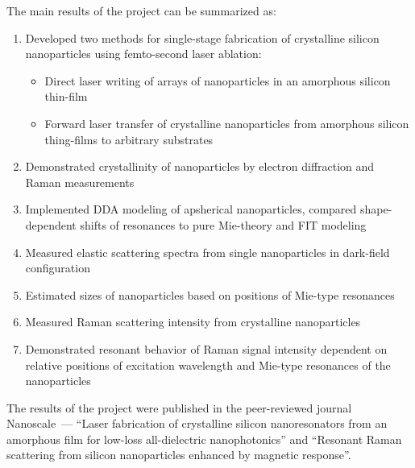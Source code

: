     \clearpage
    The main results of the project can be summarized as:
    \begin{enumerate}
        \item Developed two methods for single-stage fabrication of crystalline silicon nanoparticles using femto-second laser ablation:
            \begin{itemize}
                \item Direct laser writing of arrays of nanoparticles in an amorphous silicon thin-film
                \item Forward laser transfer of crystalline nanoparticles from amorphous silicon thing-films to arbitrary substrates
            \end{itemize}
        \item Demonstrated crystallinity of nanoparticles by electron diffraction and Raman measurements
        \item Implemented DDA modeling of apsherical nanoparticles, compared shape-dependent shifts of resonances to pure Mie-theory
            and FIT modeling
        \item Measured elastic scattering spectra from single nanoparticles in dark-field configuration
        \item Estimated sizes of nanoparticles based on positions of Mie-type resonances
        \item Measured Raman scattering intensity from crystalline nanoparticles
        \item Demonstrated resonant behavior of Raman signal intensity dependent on relative positions of excitation wavelength and Mie-type resonances
            of the nanoparticles
    \end{enumerate}

        The results of the project were published in the peer-reviewed journal Nanoscale~--- ``Laser fabrication of
    crystalline silicon nanoresonators from an amorphous film for low-loss all-dielectric nanophotonics''\cite{dmitriev2016laser} and
    ``Resonant Raman scattering from silicon nanoparticles enhanced by magnetic response''\cite{dmitriev2016resonant}.

\clearpage

